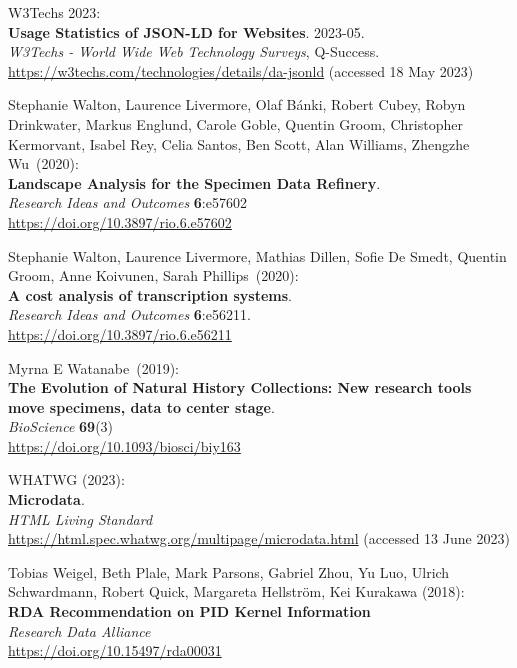 \begin{thebibliography}{9}
W3Techs 2023: \\
\textbf{Usage Statistics of JSON-LD for Websites}. 2023-05. \\
\emph{W3Techs - World Wide Web Technology Surveys}, Q-Success.\\
\url{https://w3techs.com/technologies/details/da-jsonld} (accessed 18
May 2023)

Stephanie Walton, Laurence Livermore, Olaf Bánki,
Robert Cubey, Robyn Drinkwater, Markus Englund, Carole Goble, Quentin
Groom, Christopher Kermorvant, Isabel Rey, Celia Santos, Ben Scott, Alan
Williams, Zhengzhe Wu~(2020):\\
\textbf{Landscape Analysis for the Specimen Data Refinery}.\\
\emph{Research Ideas and Outcomes} \textbf{6}:e57602\\
\url{https://doi.org/10.3897/rio.6.e57602}

Stephanie Walton, Laurence Livermore, Mathias Dillen, Sofie De Smedt, Quentin Groom, Anne Koivunen, Sarah Phillips~(2020):\\
\textbf{A cost analysis of transcription systems}. \\
\emph{Research Ideas and Outcomes} \textbf{6}:e56211.\\
\url{https://doi.org/10.3897/rio.6.e56211}

Myrna E Watanabe~(2019):\\
\textbf{The Evolution of Natural History Collections:
New research tools move specimens, data to center stage}.\\
\emph{BioScience} \textbf{69}(3)\\
\url{https://doi.org/10.1093/biosci/biy163}

WHATWG (2023): \\
\textbf{Microdata}. \\
\emph{{HTML Living Standard}}\\
\url{https://html.spec.whatwg.org/multipage/microdata.html} (accessed 13
June 2023)


Tobias Weigel, Beth Plale, Mark Parsons, Gabriel Zhou, Yu Luo, Ulrich
Schwardmann, Robert Quick, Margareta Hellström, Kei Kurakawa (2018):\\
\textbf{{RDA Recommendation} on {PID Kernel Information}} \\
\emph{Research Data Alliance}\\
\url{https://doi.org/10.15497/rda00031}


\end{thebibliography}
